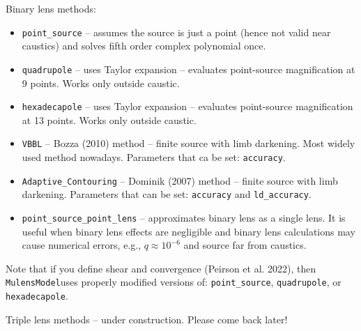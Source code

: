 \documentclass[12pt]{article}
\newcommand\MM{{\tt MulensModel}}
\begin{document}
\bigskip\bigskip
Binary lens methods:
\begin{itemize}
\item {\tt point\_source} -- assumes the source is just a point (hence not valid near caustics) and solves fifth order complex polynomial once.
\item {\tt quadrupole} -- uses Taylor expansion -- evaluates point-source magnification at 9 points.  Works only outside caustic.
\item {\tt hexadecapole} -- uses Taylor expansion -- evaluates point-source magnification at 13 points.  Works only outside caustic.
\item {\tt VBBL} -- Bozza (2010) method -- finite source with limb darkening.  Most widely used method nowadays.  Parameters that ca be set: {\tt accuracy}.
\item {\tt Adaptive\_Contouring} -- Dominik (2007) method -- finite source with limb darkening.  Parameters that can be set: {\tt accuracy} and {\tt ld\_accuracy}.
\item {\tt point\_source\_point\_lens} -- approximates binary lens as a single lens.  It is useful when binary lens effects are negligible and binary lens calculations may cause numerical errors, e.g., $q\approx10^{-6}$ and source far from caustics.  
\end{itemize}
Note that if you define shear and convergence (Peirson et al. 2022), then \MM uses properly modified versions of: {\tt point\_source}, {\tt quadrupole}, or {\tt hexadecapole}. 

\bigskip\bigskip
Triple lens methods -- under construction.  Please come back later!
\end{document}
